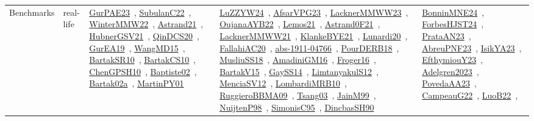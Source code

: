 {\begin{longtable}{lp{3cm}>{\raggedright\arraybackslash}p{6cm}>{\raggedright\arraybackslash}p{6cm}>{\raggedright\arraybackslash}p{8cm}}
Benchmarks & real-life & \href{../works/GurPAE23.pdf}{GurPAE23}~\cite{GurPAE23}, \href{../works/SubulanC22.pdf}{SubulanC22}~\cite{SubulanC22}, \href{../works/WinterMMW22.pdf}{WinterMMW22}~\cite{WinterMMW22}, \href{../works/Astrand21.pdf}{Astrand21}~\cite{Astrand21}, \href{../works/HubnerGSV21.pdf}{HubnerGSV21}~\cite{HubnerGSV21}, \href{../works/QinDCS20.pdf}{QinDCS20}~\cite{QinDCS20}, \href{../works/GurEA19.pdf}{GurEA19}~\cite{GurEA19}, \href{../works/WangMD15.pdf}{WangMD15}~\cite{WangMD15}, \href{../works/BartakSR10.pdf}{BartakSR10}~\cite{BartakSR10}, \href{../works/BartakCS10.pdf}{BartakCS10}~\cite{BartakCS10}, \href{../works/ChenGPSH10.pdf}{ChenGPSH10}~\cite{ChenGPSH10}, \href{../works/Baptiste02.pdf}{Baptiste02}~\cite{Baptiste02}, \href{../works/Bartak02a.pdf}{Bartak02a}~\cite{Bartak02a}, \href{../works/MartinPY01.pdf}{MartinPY01}~\cite{MartinPY01} & \href{../works/LuZZYW24.pdf}{LuZZYW24}~\cite{LuZZYW24}, \href{../works/AfsarVPG23.pdf}{AfsarVPG23}~\cite{AfsarVPG23}, \href{../works/LacknerMMWW23.pdf}{LacknerMMWW23}~\cite{LacknerMMWW23}, \href{../works/OujanaAYB22.pdf}{OujanaAYB22}~\cite{OujanaAYB22}, \href{../works/Lemos21.pdf}{Lemos21}~\cite{Lemos21}, \href{../works/Astrand0F21.pdf}{Astrand0F21}~\cite{Astrand0F21}, \href{../works/LacknerMMWW21.pdf}{LacknerMMWW21}~\cite{LacknerMMWW21}, \href{../works/KlankeBYE21.pdf}{KlankeBYE21}~\cite{KlankeBYE21}, \href{../works/Lunardi20.pdf}{Lunardi20}~\cite{Lunardi20}, \href{../works/FallahiAC20.pdf}{FallahiAC20}~\cite{FallahiAC20}, \href{../works/abs-1911-04766.pdf}{abs-1911-04766}~\cite{abs-1911-04766}, \href{../works/PourDERB18.pdf}{PourDERB18}~\cite{PourDERB18}, \href{../works/MusliuSS18.pdf}{MusliuSS18}~\cite{MusliuSS18}, \href{../works/AmadiniGM16.pdf}{AmadiniGM16}~\cite{AmadiniGM16}, \href{../works/Froger16.pdf}{Froger16}~\cite{Froger16}, \href{../works/BartakV15.pdf}{BartakV15}~\cite{BartakV15}, \href{../works/GaySS14.pdf}{GaySS14}~\cite{GaySS14}, \href{../works/LimtanyakulS12.pdf}{LimtanyakulS12}~\cite{LimtanyakulS12}, \href{../works/MenciaSV12.pdf}{MenciaSV12}~\cite{MenciaSV12}, \href{../works/LombardiMRB10.pdf}{LombardiMRB10}~\cite{LombardiMRB10}, \href{../works/RuggieroBBMA09.pdf}{RuggieroBBMA09}~\cite{RuggieroBBMA09}, \href{../works/Tsang03.pdf}{Tsang03}~\cite{Tsang03}, \href{../works/JainM99.pdf}{JainM99}~\cite{JainM99}, \href{../works/NuijtenP98.pdf}{NuijtenP98}~\cite{NuijtenP98}, \href{../works/SimonisC95.pdf}{SimonisC95}~\cite{SimonisC95}, \href{../works/DincbasSH90.pdf}{DincbasSH90}~\cite{DincbasSH90} & \href{../works/BonninMNE24.pdf}{BonninMNE24}~\cite{BonninMNE24}, \href{../works/ForbesHJST24.pdf}{ForbesHJST24}~\cite{ForbesHJST24}, \href{../works/PrataAN23.pdf}{PrataAN23}~\cite{PrataAN23}, \href{../works/AbreuPNF23.pdf}{AbreuPNF23}~\cite{AbreuPNF23}, \href{../works/IsikYA23.pdf}{IsikYA23}~\cite{IsikYA23}, \href{../works/EfthymiouY23.pdf}{EfthymiouY23}~\cite{EfthymiouY23}, \href{../works/Adelgren2023.pdf}{Adelgren2023}~\cite{Adelgren2023}, \href{../works/PovedaAA23.pdf}{PovedaAA23}~\cite{PovedaAA23}, \href{../works/CampeauG22.pdf}{CampeauG22}~\cite{CampeauG22}, \href{../works/LuoB22.pdf}{LuoB22}~\cite{LuoB22}, 
\end{longtable}}
